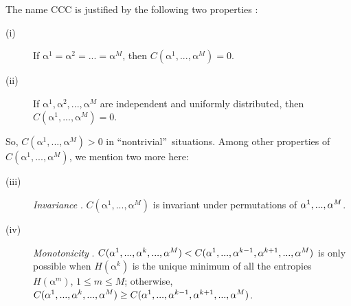 \documentclass[%
 aip,
 amsmath,amssymb,
 reprint,%
]{revtex4-1}
\begin{document}
The name CCC is justified by the following two properties \cite{Monetti2013}:

\begin{description}
\item[(i)] If $\mathrm{\alpha }^{1}=\mathrm{\alpha }^{2}=...=\mathrm{\alpha }%
^{M}$, then $C(\mathrm{\alpha }^{1},...,\mathrm{\alpha }^{M})=0$.

\item[(ii)] If $\mathrm{\alpha }^{1},\mathrm{\alpha }^{2},...,\mathrm{\alpha 
}^{M}$ are independent and uniformly distributed, then $C(\mathrm{\alpha }%
^{1},...,\mathrm{\alpha }^{M})=0$.
\end{description}

So, $C(\mathrm{\alpha }^{1},...,\mathrm{\alpha }^{M})>0$ in
\textquotedblleft nontrivial\textquotedblright\ situations. Among other
properties of $C(\mathrm{\alpha }^{1},...,\mathrm{\alpha }%
^{M})$, we mention two more here:

\begin{description}
\item[(iii)] \textit{Invariance} \cite{Monetti2013}. $C(\mathrm{\alpha }^{1},...,\mathrm{\alpha 
}^{M})$ is invariant under permutations of $\mathrm{\alpha }^{1},...,\mathrm{%
\alpha }^{M}$.

\item[(iv)] \textit{Monotonicity} \cite{Monetti2013}. $C(\mathrm{\alpha }^{1},...,\mathrm{%
\alpha }^{k},...,\mathrm{\alpha }^{M})<C(\mathrm{\alpha }^{1},...,\mathrm{%
\alpha }^{k-1},\mathrm{\alpha }^{k+1},...,\mathrm{\alpha }^{M})$ is only
possible when $H(\mathrm{\alpha }^{k})$ is the unique minimum of all the
entropies $H(\mathrm{\alpha }^{m})$, $1\leq m\leq M$; otherwise, $C(\mathrm{%
\alpha }^{1},...,\mathrm{\alpha }^{k},...,\mathrm{\alpha }^{M})\geq C(%
\mathrm{\alpha }^{1},...,\mathrm{\alpha }^{k-1},\mathrm{\alpha }^{k+1},...,%
\mathrm{\alpha }^{M})$.
\end{description}
\end{document}
